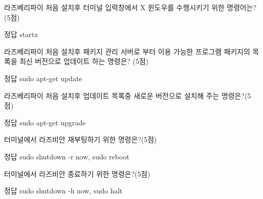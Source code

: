 \documentclass[A4paper,chapter,footnote,5pt]{oblivoir}
\begin{document}
\begin{Exlist}
\item 라즈베리파이 처음 설치후 터미널 입력창에서 X 윈도우를 수행시키기 위한 명령어는?(5점)

\begin{solution}\begin{explain}
\item[정답] startx
\end{explain}\end{solution}

\item 라즈베리파이 처음 설치후 패키지 관리 서버로 부터 이용 가능한 프로그램 패키지의 목록을 최신 버전으로 업데이트 하는 명령은? (5점)

\begin{solution}\begin{explain}
\item[정답] sudo apt-get update
\end{explain}\end{solution}

\item 라즈베리파이 처음 설치후 업데이트 목록중 새로운 버전으로 설치해 주는 명령은?(5점)

\begin{solution}\begin{explain}
\item[정답] sudo apt-get upgrade
\end{explain}\end{solution}

\item 터미널에서 라즈비안 재부팅하기 위한 명령은?(5점)

\begin{solution}\begin{explain}
\item[정답] sudo shutdown -r now, sudo reboot
\end{explain}\end{solution}

\item 터미널에서 라즈비안 종료하기 위한 명령은?(5점)

\begin{solution}\begin{explain}
\item[정답] sudo shutdown -h now, sudo halt
\end{explain}\end{solution}



\end{Exlist}
\end{document}

